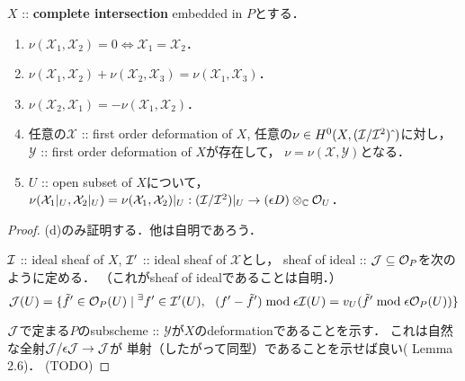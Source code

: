 \documentclass[a4paper]{jsarticle}
\newcommand{\defX}{\mathcal{X}}
\newcommand{\defY}{\mathcal{Y}}
\begin{document}
    \begin{Prop} \label{prop:properties_of_nu}
        $X$ :: \textbf{complete intersection} embedded in $P$とする．
        \begin{enumerate}[label=(\alph*), leftmargin=*]
            \item $\nu(\defX_1, \defX_2)=0 \iff \defX_1=\defX_2$．

            \item $\nu(\defX_1, \defX_2)+\nu(\defX_2, \defX_3)=\nu(\defX_1, \defX_3)$．

            \item $\nu(\defX_2, \defX_1)=-\nu(\defX_1, \defX_2)$．

            \item
                任意の$\defX$ :: first order deformation of $X$, 
                任意の$\nu \in H^0(X, (\mathcal{I}/\mathcal{I}^2)\,\hat{}\,)$に対し，
                $\defY$ :: first order deformation of $X$が存在して，
                $\nu=\nu(\defX, \defY)$となる．

            \item
                $U$ :: open subset of $X$について，
                $\nu(\defX_1|_U, \defX_2|_U)=\nu(\defX_1, \defX_2)|_U:
                (\shI/\shI^2)|_U \to (\epsilon D) \otimes_{\C} \shO_U$．
        \end{enumerate}
    \end{Prop}
    \begin{proof}
        (d)のみ証明する．他は自明であろう．
        
        $\mathcal{I}$ :: ideal sheaf of $X$,
        $\mathcal{I}'$ :: ideal sheaf of $\defX$とし，
        sheaf of ideal :: $\mathcal{J} \subseteq \mathcal{O}_{P}$を次のように定める．
        （これがsheaf of idealであることは自明．）
        \[
            \mathcal{J}(U)=\{ \tilde{f}' \in \mathcal{O}_{P}(U) \mid
                {}^{\exists} f' \in \mathcal{I}'(U),~~
            (f'-\tilde{f}') \bmod \epsilon \mathcal{I}(U)
                =v_U(\tilde{f}' \bmod \epsilon \mathcal{O}_P(U)) \}
        \]

        $\mathcal{J}$で定まる$P$のsubscheme :: $\defY$が$X$のdeformationであることを示す．
        これは自然な全射$\mathcal{J}/\epsilon \mathcal{J} \to \mathcal{J}$が
        単射（したがって同型）であることを示せば良い(\cite{DefLCI} Lemma 2.6)．
        (TODO)
    \end{proof}
\end{document}
